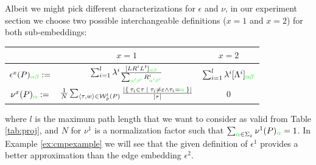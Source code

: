 Albeit we might pick different characterizations for $\epsilon$ and $\nu$, {in our experiment section} we choose two possible interchangeable definitions ($x=1$ and $x=2$) for both sub-embeddings:

\begin{center}
\begin{tabular}{c|c|c}
	\toprule
	& $x=1$ & $x=2$ \\
	\midrule
	$\epsilon^x(P)_{\color{green}\alpha\beta}:=$ & $\label{eq:epsilon}
	\sum_{i=1}^l{\lambda^i}\frac{[LR^iL^t]_{\color{green}\alpha\beta}}{\sum_{\color{green}\alpha'\beta'}R^i_{\color{green}\alpha'\beta'}}$ & $
	\sum_{i=1}^l\lambda^i[\Lambda^i]_{\color{green}\alpha\beta}$\\
	$\nu^x(P)_{\color{green}\alpha}:=$ & $\frac{1}{N}\sum_{\braket{\tau,w}\in\mathcal{W}_p^l(P)}\frac{|\Set{\tau_i\in\tau|\tau_i\neq\varepsilon\wedge \tau_i={\color{green}\alpha}}|}{|\tau|}$ & $0$ \\
	\bottomrule
\end{tabular}
\end{center}


where $l$ is the maximum path length that we want to consider as valid from Table \ref{tab:proj}, and $N$ for $\nu^1$ is a normalization factor such that $\sum_{{\color{green}\alpha}\in\Sigma_\varepsilon}\nu^1(P)_{\color{green}\alpha}=1$. In Example \ref{ex:cmpexample} we will see that the given definition of $\epsilon^1$ provides a better approximation than the edge embedding $\epsilon^2$.



